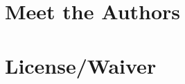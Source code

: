 \documentclass[ebook, 12pt, twoside]{memoir}
\begin{document}
\chapter[\textbf{Meet the Authors}]{Meet the Authors}
%

%
%

\cleardoublepage
\renewcommand{\indexname}{Web Pages Cited in This Book}
\onecolindex
\printindex

\newpage
\chapter[\textbf{License/Waiver}]{License/Waiver}

%
\pagestyle{empty} \thispagestyle{empty}
\clearpage\mbox{}\clearpage\mbox{}\clearpage\mbox{}\clearpage    %
\end{document}
